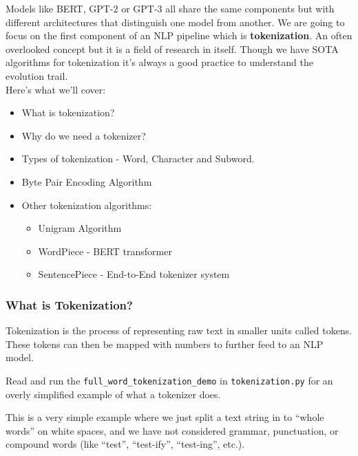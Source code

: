 Models like BERT, GPT-2 or GPT-3 all share the same components but with different architectures that distinguish one model from another.
We are going to focus on the first component of an NLP pipeline which is \textbf{tokenization}. An often overlooked concept but it is a field of research in itself. 
Though we have SOTA algorithms for tokenization it's always a good practice to understand the evolution trail. \\

\noindent Here's what we'll cover:
\begin{itemize}
    \item What is tokenization?
    \item Why do we need a tokenizer?
    \item Types of tokenization - Word, Character and Subword.
    \item Byte Pair Encoding Algorithm
    \item Other tokenization algorithms:
    \begin{itemize}
        \item Unigram Algorithm
        \item WordPiece - BERT transformer
        \item SentencePiece - End-to-End tokenizer system
    \end{itemize}
\end{itemize}

\subsubsection{What is Tokenization?}

Tokenization is the process of representing raw text in smaller units called tokens. These tokens can then be mapped with numbers to further feed to an NLP model.

\noindent Read and run the \texttt{full\_word\_tokenization\_demo} in \texttt{tokenization.py} for an overly simplified example of what a tokenizer does.

This is a very simple example where we just split a text string in to ``whole words'' on white spaces, and we have not considered grammar, punctuation, or compound words (like ``test'', ``test-ify'', ``test-ing'', etc.).

